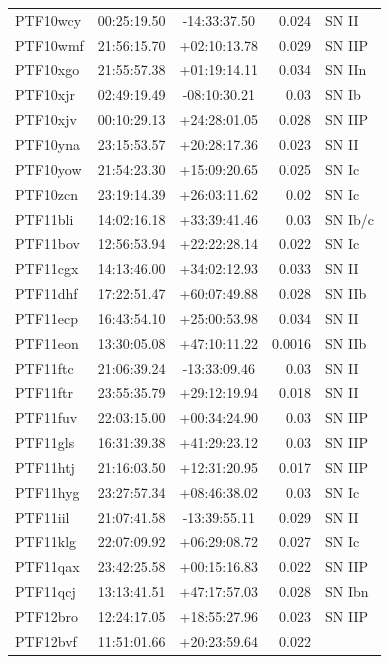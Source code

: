 \documentclass[a4paper,fleqn,usenatbib]{mnras}
\begin{document}
\begin{table}
\begin{center}
\begin{tabular}{lccrl}
    PTF10wcy & 00:25:19.50 & -14:33:37.50 & 0.024 & SN II \\
    PTF10wmf & 21:56:15.70 & +02:10:13.78 & 0.029 & SN IIP \\
    PTF10xgo & 21:55:57.38 & +01:19:14.11 & 0.034 & SN IIn \\
    PTF10xjr & 02:49:19.49 & -08:10:30.21 & 0.03 & SN Ib \\
    PTF10xjv & 00:10:29.13 & +24:28:01.05 & 0.028 & SN IIP \\
    PTF10yna & 23:15:53.57 & +20:28:17.36 & 0.023 & SN II \\
    PTF10yow & 21:54:23.30 & +15:09:20.65 & 0.025 & SN Ic \\
    PTF10zcn & 23:19:14.39 & +26:03:11.62 & 0.02 & SN Ic \\
    PTF11bli & 14:02:16.18 & +33:39:41.46 & 0.03 & SN Ib/c \\
    PTF11bov & 12:56:53.94 & +22:22:28.14 & 0.022 & SN Ic \\
    PTF11cgx & 14:13:46.00 & +34:02:12.93 & 0.033 & SN II \\
    PTF11dhf & 17:22:51.47 & +60:07:49.88 & 0.028 & SN IIb \\
    PTF11ecp & 16:43:54.10 & +25:00:53.98 & 0.034 & SN II \\
    PTF11eon & 13:30:05.08 & +47:10:11.22 & 0.0016 & SN IIb \\
    PTF11ftc & 21:06:39.24 & -13:33:09.46 & 0.03 & SN II \\
    PTF11ftr & 23:55:35.79 & +29:12:19.94 & 0.018 & SN II \\
    PTF11fuv & 22:03:15.00 & +00:34:24.90 & 0.03 & SN IIP \\
    PTF11gls & 16:31:39.38 & +41:29:23.12 & 0.03 & SN IIP \\
    PTF11htj & 21:16:03.50 & +12:31:20.95 & 0.017 & SN IIP \\
    PTF11hyg & 23:27:57.34 & +08:46:38.02 & 0.03 & SN Ic \\
    PTF11iil & 21:07:41.58 & -13:39:55.11 & 0.029 & SN II \\
    PTF11klg & 22:07:09.92 & +06:29:08.72 & 0.027 & SN Ic \\
    PTF11qax & 23:42:25.58 & +00:15:16.83 & 0.022 & SN IIP \\
    PTF11qcj & 13:13:41.51 & +47:17:57.03 & 0.028 & SN Ibn \\
    PTF12bro & 12:24:17.05 & +18:55:27.96 & 0.023 & SN IIP \\
    PTF12bvf & 11:51:01.66 & +20:23:59.64 & 0.022 &  \\

\end{tabular}
\end{center}
\end{table}
\end{document}
